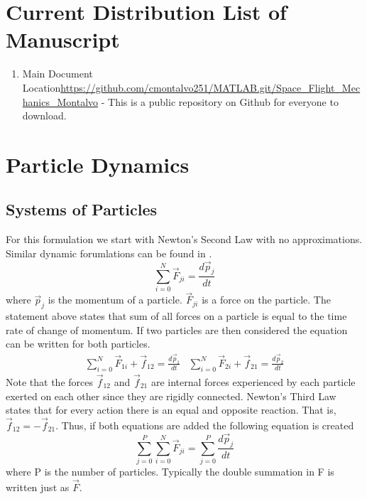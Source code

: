 \documentclass{article}
\begin{document}
\newpage

\section*{Current Distribution List of Manuscript}
\begin{enumerate}[itemsep=-5pt]
\item Main Document Location\url{https://github.com/cmontalvo251/MATLAB.git/Space_Flight_Mechanics_Montalvo} - This is a public
  repository on Github for everyone to download.
\end{enumerate}
  
\newpage

\tableofcontents

\newpage


\section{Particle Dynamics}

\subsection{Systems of Particles}

For this formulation we start with Newton's Second Law with no
approximations. Similar dynamic forumlations can be found in \cite{etkins,
  phillips,nelson,astrodynamics}.
\begin{equation}
\sum\limits_{i=0}^N \vec{F}_{ji} = \frac{d\vec{p}_j}{dt}
\end{equation}
where $\vec{p}_j$ is the momentum of a particle. $\vec{F}_{ji}$ is a
force on the particle. The statement above states that sum of all
forces on a particle is equal to the time rate of change of
momentum. If two particles are then considered the equation can
be written for both particles.
\begin{equation}
\begin{matrix}
\sum\limits_{i=0}^N \vec{F}_{1i} + \vec{f}_{12} = \frac{d\vec{p}_1}{dt} &
\sum\limits_{i=0}^N \vec{F}_{2i} + \vec{f}_{21} = \frac{d\vec{p}_2}{dt} 
\end{matrix}
\end{equation}
Note that the forces $\vec{f}_{12}$ and $\vec{f}_{21}$ are internal forces
experienced by each particle exerted on each other since they are
rigidly connected. Newton's Third Law states that for every action
there is an equal and opposite reaction. That is, $\vec{f}_{12} = -\vec{f}_{21}$. Thus, if both equations are added the following equation is
created
\begin{equation}
\sum\limits_{j=0}^P \sum\limits_{i=0}^N \vec{F}_{ji} =
\sum\limits_{j=0}^P \frac{d\vec{p}_j}{dt}
\end{equation}
where P is the number of particles. Typically the double summation
in F is written just as $\vec{F}$.
\end{document}

